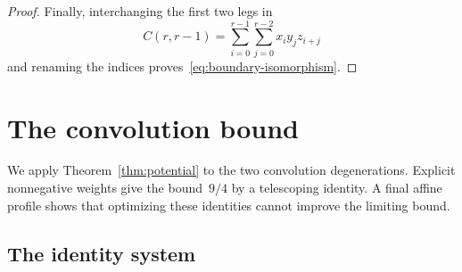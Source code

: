 \documentclass[11pt,letterpaper]{article}
\theoremstyle{definition}
\numberwithin{equation}{section}
\begin{document}
\begin{proof}
Finally, interchanging the first two legs in
\begin{equation*}
 C(r,r-1)=\sum_{i=0}^{r-1}\sum_{j=0}^{r-2}x_i y_jz_{i+j}
\end{equation*}
and renaming the indices proves~\eqref{eq:boundary-isomorphism}.
\end{proof}



\section{The convolution bound}
\label{sec:application}

We apply Theorem~\ref{thm:potential} to the two convolution degenerations. Explicit nonnegative weights give the bound~$9/4$ by a telescoping identity. A final affine profile shows that optimizing these identities cannot improve the limiting bound.

\subsection{The identity system}
\end{document}
